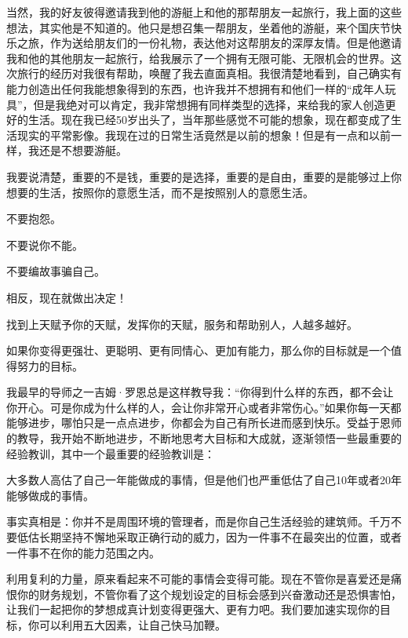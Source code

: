 当然，我的好友彼得邀请我到他的游艇上和他的那帮朋友一起旅行，我上面的这些想法，其实他是不知道的。他只是想召集一帮朋友，坐着他的游艇，来个国庆节快乐之旅，作为送给朋友们的一份礼物，表达他对这帮朋友的深厚友情。但是他邀请我和他的其他朋友一起旅行，给我展示了一个拥有无限可能、无限机会的世界。这次旅行的经历对我很有帮助，唤醒了我去直面真相。我很清楚地看到，自己确实有能力创造出任何我能想象得到的东西，也许我并不想拥有和他们一样的“成年人玩具”，但是我绝对可以肯定，我非常想拥有同样类型的选择，来给我的家人创造更好的生活。现在我已经50岁出头了，当年那些感觉不可能的想象，现在都变成了生活现实的平常影像。我现在过的日常生活竟然是以前的想象！但是有一点和以前一样，我还是不想要游艇。

我要说清楚，重要的不是钱，重要的是选择，重要的是自由，重要的是能够过上你想要的生活，按照你的意愿生活，而不是按照别人的意愿生活。

不要抱怨。

不要说你不能。

不要编故事骗自己。

相反，现在就做出决定！

找到上天赋予你的天赋，发挥你的天赋，服务和帮助别人，人越多越好。

如果你变得更强壮、更聪明、更有同情心、更加有能力，那么你的目标就是一个值得努力的目标。

我最早的导师之一吉姆·罗恩总是这样教导我：“你得到什么样的东西，都不会让你开心。可是你成为什么样的人，会让你非常开心或者非常伤心。”如果你每一天都能够进步，哪怕只是一点点进步，你都会为自己有所长进而感到快乐。受益于恩师的教导，我开始不断地进步，不断地思考大目标和大成就，逐渐领悟一些最重要的经验教训，其中一个最重要的经验教训是：

大多数人高估了自己一年能做成的事情，但是他们也严重低估了自己10年或者20年能够做成的事情。

事实真相是：你并不是周围环境的管理者，而是你自己生活经验的建筑师。千万不要低估长期坚持不懈地采取正确行动的威力，因为一件事不在最突出的位置，或者一件事不在你的能力范围之内。

利用复利的力量，原来看起来不可能的事情会变得可能。现在不管你是喜爱还是痛恨你的财务规划，不管你看了这个规划设定的目标会感到兴奋激动还是恐惧害怕，让我们一起把你的梦想成真计划变得更强大、更有力吧。我们要加速实现你的目标，你可以利用五大因素，让自己快马加鞭。
